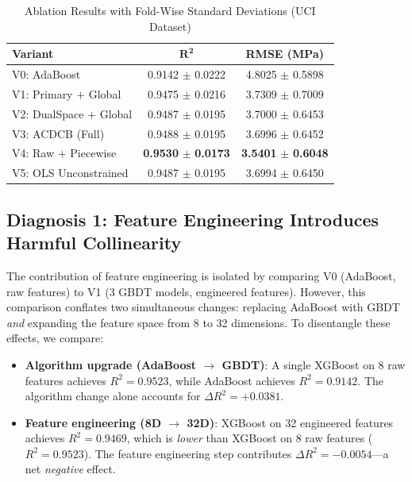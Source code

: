 \documentclass[journal]{IEEEtran}
\begin{document}
\begin{table}[!t]
\renewcommand{\arraystretch}{1.2}
\caption{Ablation Results with Fold-Wise Standard Deviations (UCI Dataset)}
\label{tab:ablation}
\centering
\footnotesize
\begin{tabular}{p{2.6cm}cc}
\toprule
\textbf{Variant} & $\boldsymbol{R^2}$ & \textbf{RMSE (MPa)} \\
\midrule
V0: AdaBoost           & 0.9142 $\pm$ 0.0222 & 4.8025 $\pm$ 0.5898 \\
V1: Primary $+$ Global   & 0.9475 $\pm$ 0.0216 & 3.7309 $\pm$ 0.7009 \\
V2: DualSpace $+$ Global & 0.9487 $\pm$ 0.0195 & 3.7000 $\pm$ 0.6453 \\
V3: ACDCB (Full)       & 0.9488 $\pm$ 0.0195 & 3.6996 $\pm$ 0.6452 \\
V4: Raw $+$ Piecewise   & \textbf{0.9530} $\pm$ \textbf{0.0173} & \textbf{3.5401} $\pm$ \textbf{0.6048} \\
V5: OLS Unconstrained   & 0.9487 $\pm$ 0.0195 & 3.6994 $\pm$ 0.6450 \\
\bottomrule
\end{tabular}
\end{table}

\subsection{Diagnosis 1: Feature Engineering Introduces Harmful Collinearity}

The contribution of feature engineering is isolated by comparing V0 (AdaBoost, raw features) to V1 (3 GBDT models, engineered features). However, this comparison conflates two simultaneous changes: replacing AdaBoost with GBDT \emph{and} expanding the feature space from 8 to 32 dimensions. To disentangle these effects, we compare:

\begin{itemize}
\item \textbf{Algorithm upgrade (AdaBoost $\to$ GBDT)}: A single XGBoost on 8 raw features achieves $R^2 = 0.9523$, while AdaBoost achieves $R^2 = 0.9142$. The algorithm change alone accounts for $\Delta R^2 = +0.0381$.
\item \textbf{Feature engineering (8D $\to$ 32D)}: XGBoost on 32 engineered features achieves $R^2 = 0.9469$, which is \emph{lower} than XGBoost on 8 raw features ($R^2 = 0.9523$). The feature engineering step contributes $\Delta R^2 = -0.0054$---a net \emph{negative} effect.
\end{itemize}
\end{document}
